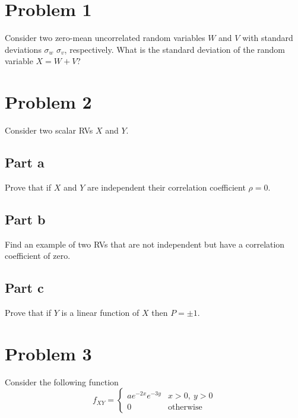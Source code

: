 \documentclass[11pt]{article}
\begin{document}
\thispagestyle{empty}

\newlength{\boxlength}\setlength{\boxlength}{\textwidth}
\addtolength{\boxlength}{-4mm}

\begin{center}
\end{center}

\section*{Problem 1}
Consider two zero-mean uncorrelated random variables $W$ and $V$ with standard deviations $\sigma_w$ $\sigma_v$, respectively. What is the standard deviation of the random variable $X=W+V$?

\section*{Problem 2}
Consider two scalar RVs $X$ and $Y$.

\subsection*{Part a}
Prove that if $X$ and $Y$ are independent their correlation coefficient $\rho=0$.

\subsection*{Part b}
Find an example of two RVs that are not independent but have a correlation coefficient of zero.

\subsection*{Part c}
Prove that if $Y$ is a linear function of $X$ then $P=\pm1$.

\section*{Problem 3}
Consider the following function
\begin{equation*}
	f_{XY}=\begin{cases} ae^{-2x}e^{-3y} & x>0,\ y>0 \\ 0 & \text{otherwise} \end{cases}
\end{equation*}
\end{document}
